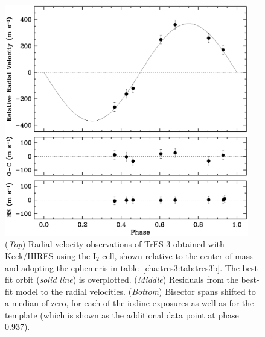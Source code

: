 \begin{figure}
\begin{center}
\includegraphics[width=0.95\textwidth]{5_f1}
\caption[%
Radial-velocity observations of TrES-3]{%
({\it Top}) Radial-velocity observations of TrES-3 obtained with Keck/HIRES using the
$\mathrm{I}_2$ cell, shown relative to the center of mass and adopting the ephemeris in table~\ref{cha:tres3:tab:tres3b}.
The best-fit orbit ({\it solid line}) is overplotted.
({\it Middle}) Residuals from the best-fit model to the radial velocities.
({\it Bottom}) Bisector spans shifted to a median of zero, for each of the iodine exposures as well as for the template (which is shown as the additional data point at phase 0.937).%
}
\label{cha:tres3:fig:rvtres3}
\end{center}
\end{figure}

